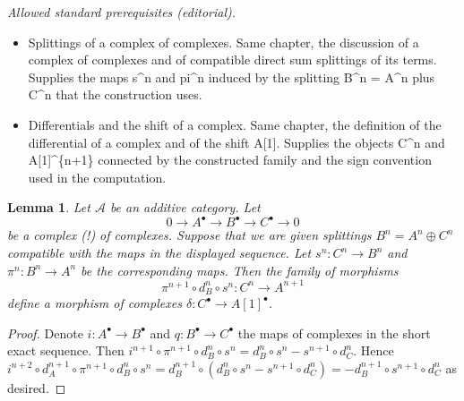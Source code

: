 \documentclass[10pt,a4paper]{amsart}
\theoremstyle{plain}
\newtheorem{lemma}[subsection]{Lemma}
\theoremstyle{definition}
\theoremstyle{remark}
\numberwithin{equation}{subsection}
\begin{document}
\noindent\textit{Allowed standard prerequisites (editorial).}\begin{itemize}
\item Splittings of a complex of complexes. Same chapter, the discussion of a complex of complexes and of compatible direct sum splittings of its terms. Supplies the maps s\textasciicircum{}n and pi\textasciicircum{}n induced by the splitting B\textasciicircum{}n = A\textasciicircum{}n plus C\textasciicircum{}n that the construction uses.
\item Differentials and the shift of a complex. Same chapter, the definition of the differential of a complex and of the shift A[1]. Supplies the objects C\textasciicircum{}n and A[1]\textasciicircum{}\{n+1\} connected by the constructed family and the sign convention used in the computation.
\end{itemize}\medskip
\begin{lemma}
\label{lemma-ses-termwise-split-cochain}
Let $\mathcal{A}$ be an additive category.
Let
$$
0 \to A^\bullet \to B^\bullet \to C^\bullet \to 0
$$
be a complex (!) of complexes.
Suppose that we are given splittings $B^n = A^n \oplus C^n$
compatible with the maps in the displayed sequence.
Let $s^n : C^n \to B^n$ and $\pi^n : B^n \to A^n$ be the
corresponding maps. Then the family of morphisms
$$
\pi^{n + 1} \circ d_B^n \circ s^n
:
C^n \to A^{n + 1}
$$
define a morphism of complexes $\delta : C^\bullet \to A[1]^\bullet$.
\end{lemma}

\begin{proof}
Denote $i : A^\bullet \to B^\bullet$ and $q : B^\bullet \to C^\bullet$
the maps of complexes in the short exact sequence. Then
$i^{n + 1} \circ \pi^{n + 1} \circ d_B^n \circ s^n =
d_B^n \circ s^n - s^{n + 1} \circ d_C^n$. Hence
$i^{n + 2} \circ d_A^{n + 1} \circ \pi^{n + 1} \circ d_B^n \circ s^n =
d_B^{n + 1} \circ (d_B^n \circ s^n - s^{n + 1} \circ d_C^n) =
- d_B^{n + 1} \circ s^{n + 1} \circ d_C^n$ as desired.
\end{proof}
\end{document}
